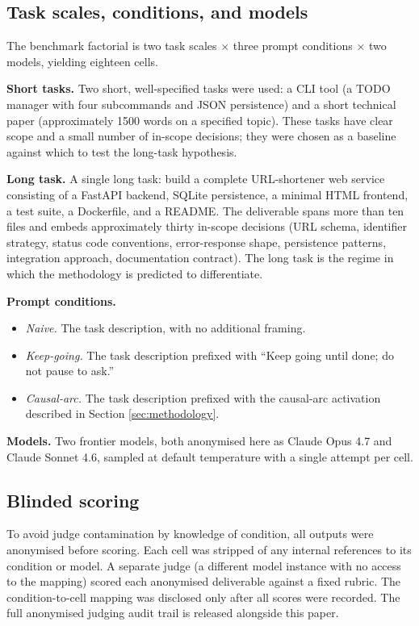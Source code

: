 \documentclass[11pt]{article}
\begin{document}
\subsection{Task scales, conditions, and models}

The benchmark factorial is two task scales $\times$ three prompt conditions
$\times$ two models, yielding eighteen cells.

\textbf{Short tasks.} Two short, well-specified tasks were used: a CLI tool
(a TODO manager with four subcommands and JSON persistence) and a short
technical paper (approximately 1500 words on a specified topic). These
tasks have clear scope and a small number of in-scope decisions; they were
chosen as a baseline against which to test the long-task hypothesis.

\textbf{Long task.} A single long task: build a complete URL-shortener web
service consisting of a FastAPI backend, SQLite persistence, a minimal
HTML frontend, a test suite, a Dockerfile, and a README. The deliverable
spans more than ten files and embeds approximately thirty in-scope
decisions (URL schema, identifier strategy, status code conventions,
error-response shape, persistence patterns, integration approach,
documentation contract). The long task is the regime in which the
methodology is predicted to differentiate.

\textbf{Prompt conditions.}
\begin{itemize}[leftmargin=*]
  \item \emph{Naive.} The task description, with no additional framing.
  \item \emph{Keep-going.} The task description prefixed with ``Keep going
  until done; do not pause to ask.''
  \item \emph{Causal-arc.} The task description prefixed with the
  causal-arc activation described in Section \ref{sec:methodology}.
\end{itemize}

\textbf{Models.} Two frontier models, both anonymised here as Claude Opus
4.7 and Claude Sonnet 4.6, sampled at default temperature with a single
attempt per cell.

\subsection{Blinded scoring}

To avoid judge contamination by knowledge of condition, all outputs were
anonymised before scoring. Each cell was stripped of any internal
references to its condition or model. A separate judge (a different model
instance with no access to the mapping) scored each anonymised deliverable
against a fixed rubric. The condition-to-cell mapping was disclosed only
after all scores were recorded. The full anonymised judging audit trail is
released alongside this paper.
\end{document}
